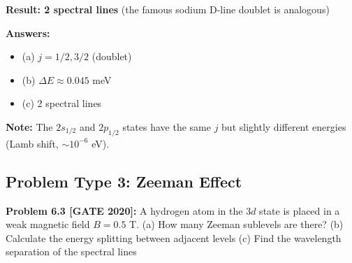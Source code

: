 \documentclass[12pt,a4paper]{article}
\begin{document}
\begin{solution}
\textbf{Result: 2 spectral lines} (the famous sodium D-line doublet is analogous)

\textbf{Answers:}
\begin{itemize}
    \item (a) $j = 1/2, 3/2$ (doublet)
    \item (b) $\Delta E \approx 0.045$ meV
    \item (c) 2 spectral lines
\end{itemize}

\textbf{Note:} The $2s_{1/2}$ and $2p_{1/2}$ states have the same $j$ but slightly different energies (Lamb shift, $\sim 10^{-6}$ eV).
\end{solution}

\subsection{Problem Type 3: Zeeman Effect}

\textbf{Problem 6.3 [GATE 2020]:} A hydrogen atom in the $3d$ state is placed in a weak magnetic field $B = 0.5$ T. 
(a) How many Zeeman sublevels are there?
(b) Calculate the energy splitting between adjacent levels
(c) Find the wavelength separation of the spectral lines
\end{document}
